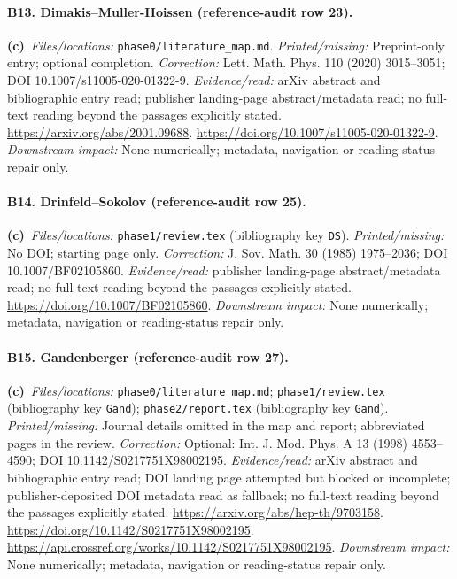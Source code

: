 \documentclass[11pt,a4paper]{article}
\newcommand{\C}{\textbf{(c)}\ }
\newcommand{\file}[1]{\nolinkurl{#1}}
\begin{document}
\paragraph{B13. Dimakis--Muller-Hoissen (reference-audit row 23).}
\C \textit{Files/locations:} \file{phase0/literature_map.md}.
\textit{Printed/missing:} Preprint-only entry; optional completion.
\textit{Correction:} Lett. Math. Phys. 110 (2020) 3015--3051; DOI 10.1007/s11005-020-01322-9.
\textit{Evidence/read:} arXiv abstract and bibliographic entry read; publisher landing-page abstract/metadata read; no full-text reading beyond the passages explicitly stated.
\url{https://arxiv.org/abs/2001.09688}.
\url{https://doi.org/10.1007/s11005-020-01322-9}.
\textit{Downstream impact:} None numerically; metadata, navigation or reading-status repair only.
\paragraph{B14. Drinfeld--Sokolov (reference-audit row 25).}
\C \textit{Files/locations:} \file{phase1/review.tex} (bibliography key \file{DS}).
\textit{Printed/missing:} No DOI; starting page only.
\textit{Correction:} J. Sov. Math. 30 (1985) 1975--2036; DOI 10.1007/BF02105860.
\textit{Evidence/read:} publisher landing-page abstract/metadata read; no full-text reading beyond the passages explicitly stated.
\url{https://doi.org/10.1007/BF02105860}.
\textit{Downstream impact:} None numerically; metadata, navigation or reading-status repair only.
\paragraph{B15. Gandenberger (reference-audit row 27).}
\C \textit{Files/locations:} \file{phase0/literature_map.md}; \file{phase1/review.tex} (bibliography key \file{Gand}); \file{phase2/report.tex} (bibliography key \file{Gand}).
\textit{Printed/missing:} Journal details omitted in the map and report; abbreviated pages in the review.
\textit{Correction:} Optional: Int. J. Mod. Phys. A 13 (1998) 4553--4590; DOI 10.1142/S0217751X98002195.
\textit{Evidence/read:} arXiv abstract and bibliographic entry read; DOI landing page attempted but blocked or incomplete; publisher-deposited DOI metadata read as fallback; no full-text reading beyond the passages explicitly stated.
\url{https://arxiv.org/abs/hep-th/9703158}.
\url{https://doi.org/10.1142/S0217751X98002195}.
\url{https://api.crossref.org/works/10.1142/S0217751X98002195}.
\textit{Downstream impact:} None numerically; metadata, navigation or reading-status repair only.
\end{document}
